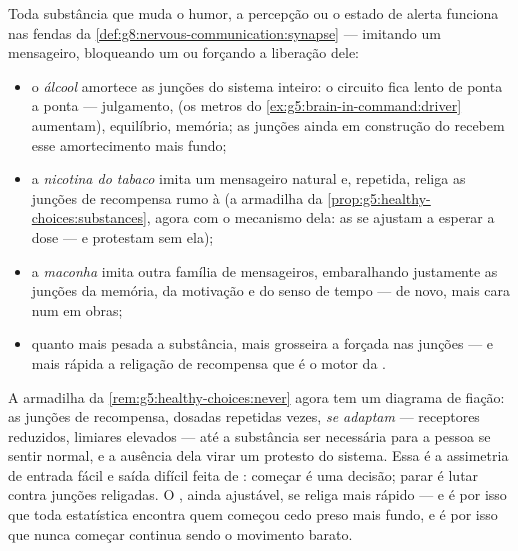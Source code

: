 \begin{proposition}\label{prop:g8:protecting-the-nervous-system:substances}
Toda substância que muda o humor, a percepção ou o estado de alerta
funciona nas fendas da
\cref{def:g8:nervous-communication:synapse} --- imitando um
mensageiro, bloqueando um ou forçando a liberação dele:
\begin{itemize}
  \item o \emph{álcool} amortece as junções do sistema inteiro: o
        circuito fica lento de ponta a ponta --- julgamento,  (os metros do \cref{ex:g5:brain-in-command:driver}
        aumentam), equilíbrio, memória; as junções ainda em construção
        do   recebem esse amortecimento mais fundo;
  \item a \emph{nicotina do tabaco} imita um mensageiro natural e,
        repetida, religa as junções de recompensa rumo à
        \emph{} (a armadilha da
        \cref{prop:g5:healthy-choices:substances}, agora com o
        mecanismo dela: as  se ajustam a esperar a dose --- e
        protestam sem ela);
  \item a \emph{maconha} imita outra família de mensageiros,
        embaralhando justamente as junções da memória, da motivação e
        do senso de tempo --- de novo, mais cara num  em obras;
  \item quanto mais pesada a substância, mais grosseira a forçada nas
        junções --- e mais rápida a religação de recompensa que é o
        motor da .
\end{itemize}
\end{proposition}
\admitted

\begin{remark}\label{rem:g8:protecting-the-nervous-system:addiction}
A armadilha da \cref{rem:g5:healthy-choices:never} agora tem um
diagrama de fiação: as junções de recompensa, dosadas repetidas vezes,
\emph{se adaptam} --- receptores reduzidos, limiares elevados --- até a
substância ser necessária para a pessoa se sentir normal, e a ausência
dela virar um protesto do sistema. Essa  é a assimetria de
entrada fácil e saída difícil feita de : começar é uma
decisão; parar é lutar contra junções religadas. O 
, ainda ajustável, se religa mais rápido --- e é por isso
que toda estatística encontra quem começou cedo preso mais fundo, e é
por isso que nunca começar continua sendo o movimento barato.
\end{remark}

